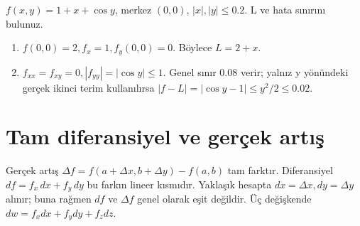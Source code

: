 \begin{tcolorbox}[title={Örnek 5.10 | Küçük bölgede kosinüs hatası},colframe=accent]\(f(x,y)=1+x+\cos y\), merkez \((0,0)\), \(|x|,|y|\le0.2\). L ve hata sınırını bulunuz.
\par{}\end{tcolorbox}
\begin{tcolorbox}[title={Adım adım çözüm},colback=green!3!white,colframe=green]\begin{enumerate}
\item \(f(0,0)=2,f_x=1,f_y(0,0)=0\). Böylece \(L=2+x\).
\item \(f_{xx}=f_{xy}=0,|f_{yy}|=|\cos y|\le1\). Genel sınır 0.08 verir; yalnız y yönündeki gerçek ikinci terim kullanılırsa \(|f-L|=|\cos y-1|\le y^2/2\le0.02\).
\end{enumerate}\end{tcolorbox}
\section{Tam diferansiyel ve gerçek artış}
Gerçek artış \(\Delta f=f(a+\Delta x,b+\Delta y)-f(a,b)\) tam farktır. Diferansiyel \(df=f_x\,dx+f_y\,dy\) bu farkın lineer kısmıdır. Yaklaşık hesapta \(dx=\Delta x,dy=\Delta y\) alınır; buna rağmen \(df\) ve \(\Delta f\) genel olarak eşit değildir. Üç değişkende \(dw=f_xdx+f_ydy+f_zdz\).

